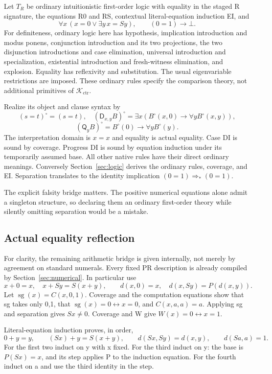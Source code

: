 \documentclass[11pt,letterpaper]{article}
\theoremstyle{definition}\newtheorem{definition}[theorem]{Definition}
\theoremstyle{remark}\newtheorem{remark}[theorem]{Remark}
\newcommand{\Acal}{\mathcal K_{\mathrm{ctr}}}
\newcommand{\D}{\ensuremath{\mathsf D}}
\newcommand{\Q}{\ensuremath{\mathsf Q}}
\begin{document}
Let $T_R$ be ordinary intuitionistic first-order logic with equality
in the staged R signature, the equations R0 and RS, contextual
literal-equation induction EI, and
\[
 \forall x\,(x=0\vee\exists y\,x=Sy),\qquad (0=1)\to\bot.
 \tag{Boundary}
\]
For definiteness, ordinary logic here has hypothesis, implication
introduction and modus ponens, conjunction introduction and its two
projections, the two disjunction introductions and case elimination,
universal introduction and specialization, existential introduction and
fresh-witness elimination, and explosion. Equality has reflexivity and
substitution. The usual eigenvariable restrictions are imposed. These
ordinary rules specify the comparison theory, not additional primitives
of $\Acal$.

Realize its object and clause syntax by
\[
 (s=t)^\circ=(s=t),\quad
 (\D_{x,y}B)^\circ=\exists x(B^\circ(x,0)\to\forall yB^\circ(x,y)),
\]
\[
                 (\Q_yB)^\circ=B^\circ(0)\to\forall yB^\circ(y).
\]
The interpretation domain is $x=x$ and equality is actual equality.
Case DI is sound by coverage. Progress DI is sound by equation
induction under its temporarily assumed base. All other native rules
have their direct ordinary meanings. Conversely Section~\ref{sec:logic}
derives the ordinary rules, coverage, and EI. Separation translates to
the identity implication $(0=1)\Rightarrow_*(0=1)$.

The explicit falsity bridge matters. The positive numerical equations
alone admit a singleton structure, so declaring them an ordinary
first-order theory while silently omitting separation would be a mistake.

\subsection{Actual equality reflection}

For clarity, the remaining arithmetic bridge is given internally,
not merely by agreement on standard numerals. Every fixed PR description
is already compiled by Section~\ref{sec:numerical}. In particular use
\[
 x+0=x,\quad x+Sy=S(x+y),\qquad
 d(x,0)=x,\quad d(x,Sy)=P(d(x,y)).
\]
Let $\operatorname{sg}(x)=C(x,0,1)$. Coverage and the computation
equations show that sg takes only 0,1, that
$\operatorname{sg}(x)=0\leftrightarrow x=0$, and $C(x,a,a)=a$.
Applying sg and separation gives $Sx\ne0$. Coverage and W give
$W(x)=0\leftrightarrow x=1$.

Literal-equation induction proves, in order,
\[
 0+y=y,\qquad (Sx)+y=S(x+y),\qquad
 d(Sx,Sy)=d(x,y),\qquad d(Sa,a)=1.
\]
For the first two induct on y with x fixed. For the third induct on y:
the base is $P(Sx)=x$, and its step applies P to the induction equation.
For the fourth induct on a and use the third identity in the step.
\end{document}
